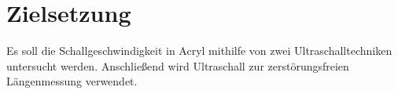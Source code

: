 
\section{Zielsetzung}
\label{sec:Zielsetzung}
Es soll die Schallgeschwindigkeit in Acryl mithilfe von zwei Ultraschalltechniken untersucht werden.
 Anschließend wird Ultraschall zur zerstörungsfreien Längenmessung verwendet. 
